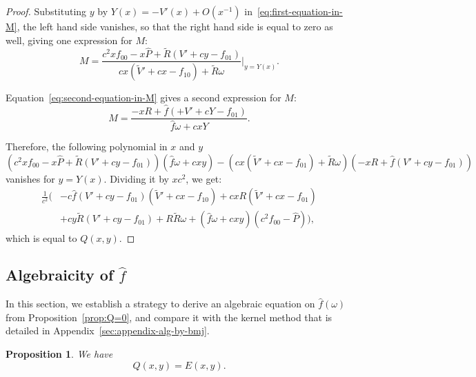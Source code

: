 \documentclass{scrartcl}
\newcommand\wh[1]{\widehat{#1}}
\newtheorem{prop}[thm]{Proposition}
\begin{document}
\begin{proof}
Substituting $y$ by $Y(x)=-V'(x)+O(x^{-1})$ in~\eqref{eq:first-equation-in-M}, the left hand side vanishes, so that the right hand side is equal to zero as well, giving one expression for $M$:
\begin{equation*}
M = \frac{c^2xf_{00} - x\widehat{P} + \widetilde{R}(V'+cy-f_{01})}{cx(\widetilde{V}'+cx-f_{10})+\widetilde{R}\omega}\lvert_{y=Y(x)}. 
\end{equation*}

Equation~\eqref{eq:second-equation-in-M} gives a second expression for $M$:
\begin{equation*}
M=\frac{-xR + \widehat{f}(+V'+cY-f_{01})}{\widehat{f}\omega + cxY}.
\end{equation*}

Therefore, the following polynomial in $x$ and $y$
\begin{equation*}
\left(c^2xf_{00} - x\widehat{P} + \widetilde{R}(V'+cy-f_{01})\right)\left(\widehat{f}\omega + cxy\right) - \left(cx(\widetilde{V}'+cx-f_{01})+\widetilde{R}\omega\right)\left(-xR + \widehat{f}(V'+cy-f_{01})\right)
\end{equation*}
vanishes for $y=Y(x)$. Dividing it by $xc^2$, we get:
\begin{equation*}
\begin{aligned}
\frac{1}{c^2}\Big(&- c \widehat{f} (V'+cy-f_{01})(\widetilde{V}'+cx -f_{10}) + cxR(\widetilde{V}'+cx -f_{01}) \\
&+ cy\widetilde{R}(V' +cy -f_{01}) +R\widetilde{R}\omega + (\widehat{f}\omega +cxy)(c^2f_{00}-\widehat{P})\Big),
\end{aligned}
\end{equation*}
which is equal to $Q(x,y)$.
\end{proof}


\subsection{Algebraicity of $\wh{f}$}
\label{sec: algebraicity-2-strats}

In this section, we establish a strategy to derive an algebraic equation on $\wh{f}(\omega)$ from Proposition~\ref{prop:Q=0}, and compare it with the kernel method that is detailed in Appendix~\ref{sec:appendix-alg-by-bmj}.

\begin{prop}
We have
\begin{equation}
Q(x,y)=E(x,y).
\label{eq:Q=E}
\end{equation}
\label{prop:Q=E}
\end{prop}
\end{document}
